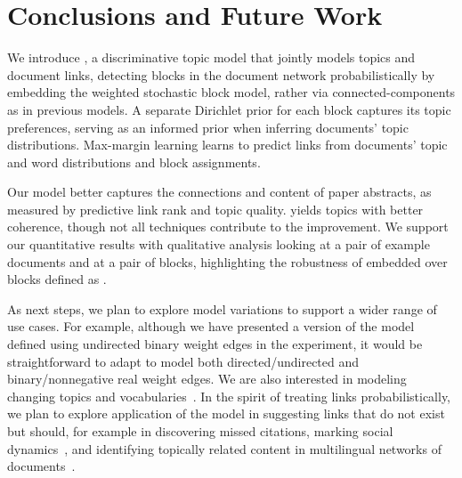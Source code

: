 \section{Conclusions and Future Work}
\label{sec:conclusion}

We introduce \lexwsbmedrtm, a discriminative topic model that jointly
models topics and document links, detecting blocks in the document
network probabilistically by embedding the weighted stochastic block
model, rather via connected-components as in previous models.  A
separate Dirichlet prior for each block captures its topic
preferences, serving as an informed prior when inferring documents'
topic distributions. Max-margin learning learns to predict links from
documents' topic and word distributions and block assignments.

Our model better captures the connections and content of paper abstracts,
as measured by predictive link rank and topic quality.
\lexwsbmedrtm yields topics with better coherence, though not all
techniques contribute to the improvement. We support our
quantitative results with qualitative analysis looking at a pair of
example documents and at a pair of blocks, highlighting the robustness
of embedded \wsbm over blocks defined as \scc.

As next steps, we plan to explore model variations to support a wider range of
use cases. For example, although we have presented a version of the model
defined using undirected binary weight edges in the experiment, it would be
straightforward to adapt to model both directed/undirected and
binary/nonnegative real weight edges. We are also interested in modeling
changing topics and vocabularies~\cite{blei-06b,zhai-13}.  In the spirit of
treating links probabilistically, we plan to explore application of the model in
suggesting links that do not exist but should, for example in discovering missed
citations, marking social dynamics~\cite{nguyen-2014-sits-journal}, and identifying topically
related content in multilingual networks of
documents~\cite{Hu:Zhai:Eidelman:Boyd-Graber-2014}.
